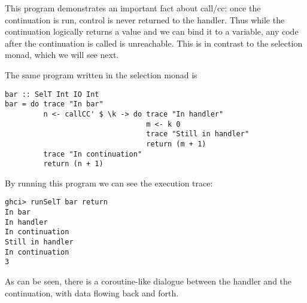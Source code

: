 \documentclass{article}
\begin{document}
This program demonstrates an important fact about call/cc: once the continuation is run, control is never returned to the handler. Thus while the continuation logically returns a value and we can bind it to a variable, any code after the continuation is called is unreachable. This is in contrast to the selection monad, which we will see next.

The same program written in the selection monad is
\begin{verbatim}
bar :: SelT Int IO Int
bar = do trace "In bar"
         n <- callCC' $ \k -> do trace "In handler"
                                 m <- k 0
                                 trace "Still in handler"
                                 return (m + 1)
         trace "In continuation"
         return (n + 1)
\end{verbatim}
By running this program we can see the execution trace:
\begin{verbatim}
ghci> runSelT bar return
In bar
In handler
In continuation
Still in handler
In continuation
3
\end{verbatim}
As can be seen, there is a coroutine-like dialogue between the handler and the continuation, with data flowing back and forth.
\end{document}
